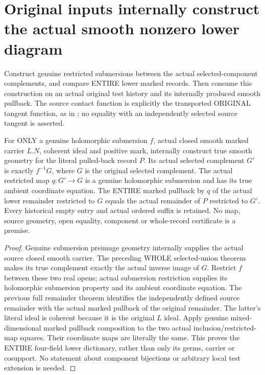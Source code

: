 \section{Original inputs internally construct the actual smooth nonzero lower diagram}

Construct genuine restricted submersions between the actual selected-component
complements, and compare ENTIRE lower marked records. Then consume this
construction on an actual original test history and its internally produced
smooth pullback. The source contact function is explicitly the transported
ORIGINAL tangent function, as in \cite[Section 7]{bierstone-milman08-functoriality};
no equality with an independently selected source tangent is asserted.

\begin{theorem}
\label{hir:actual-selected-complement-smooth-lower-open-diagram}
\leanok
For ONLY a genuine holomorphic submersion $f$, actual closed smooth marked
carrier $L.N$, coherent ideal and positive mark, internally construct true
smooth geometry for the literal pulled-back record $P$. Its actual selected
complement $G'$ is exactly $f^{-1}G$, where $G$ is the original selected
complement. The actual restricted map $q:G'\to G$ is a genuine holomorphic
submersion and has its true ambient coordinate equation. The ENTIRE marked
pullback by $q$ of the actual lower remainder restricted to $G$ equals the
actual remainder of $P$ restricted to $G'$. Every historical empty entry and
actual ordered suffix is retained. No map, source geometry, open equality,
component or whole-record certificate is a premise.
\end{theorem}
\begin{proof}
Genuine submersion preimage geometry internally supplies the actual source
closed smooth carrier. The preceding WHOLE selected-union theorem makes
its true complement exactly the actual inverse image of $G$. Restrict
$f$ between these two real opens; actual submersion restriction supplies
its holomorphic submersion property and its ambient coordinate equation.
The previous full remainder theorem identifies the independently defined
source remainder with the actual marked pullback of the original remainder.
The latter's literal ideal is coherent because it is the original $L$ ideal.
Apply genuine mixed-dimensional marked pullback composition to the two
actual inclusion/restricted-map squares. Their coordinate maps are literally
the same. This proves the ENTIRE four-field lower dictionary, rather than
only its germs, carrier or cosupport. No statement about component bijections
or arbitrary local test extension is needed.
\end{proof}

